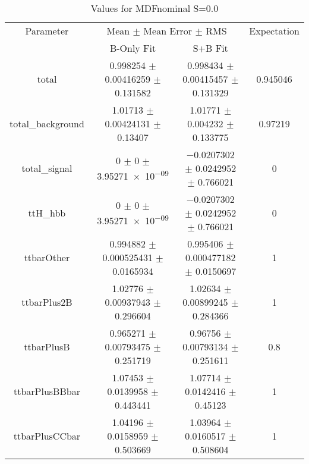 \begin{table}
\centering
\caption{Values for MDFnominal S=0.0}
\begin{tabular}{cccc}
\toprule
Parameter & \multicolumn{2}{c}{Mean $\pm$ Mean Error $\pm$ RMS} & Expectation\\
 & B-Only Fit & S+B Fit & \\
\midrule
total & \num{0.998254} $\pm$ \num{0.00416259} $\pm$ \num{0.131582} & \num{0.998434} $\pm$ \num{0.00415457} $\pm$ \num{0.131329} & \num{0.945046}\\
total\_background & \num{1.01713} $\pm$ \num{0.00424131} $\pm$ \num{0.13407} & \num{1.01771} $\pm$ \num{0.004232} $\pm$ \num{0.133775} & \num{0.97219}\\
total\_signal & \num{0} $\pm$ \num{0} $\pm$ \num{3.95271e-09} & \num{-0.0207302} $\pm$ \num{0.0242952} $\pm$ \num{0.766021} & \num{0}\\
ttH\_hbb & \num{0} $\pm$ \num{0} $\pm$ \num{3.95271e-09} & \num{-0.0207302} $\pm$ \num{0.0242952} $\pm$ \num{0.766021} & \num{0}\\
ttbarOther & \num{0.994882} $\pm$ \num{0.000525431} $\pm$ \num{0.0165934} & \num{0.995406} $\pm$ \num{0.000477182} $\pm$ \num{0.0150697} & \num{1}\\
ttbarPlus2B & \num{1.02776} $\pm$ \num{0.00937943} $\pm$ \num{0.296604} & \num{1.02634} $\pm$ \num{0.00899245} $\pm$ \num{0.284366} & \num{1}\\
ttbarPlusB & \num{0.965271} $\pm$ \num{0.00793475} $\pm$ \num{0.251719} & \num{0.96756} $\pm$ \num{0.00793134} $\pm$ \num{0.251611} & \num{0.8}\\
ttbarPlusBBbar & \num{1.07453} $\pm$ \num{0.0139958} $\pm$ \num{0.443441} & \num{1.07714} $\pm$ \num{0.0142416} $\pm$ \num{0.45123} & \num{1}\\
ttbarPlusCCbar & \num{1.04196} $\pm$ \num{0.0158959} $\pm$ \num{0.503669} & \num{1.03964} $\pm$ \num{0.0160517} $\pm$ \num{0.508604} & \num{1}\\
\bottomrule
\end{tabular}
\end{table}
